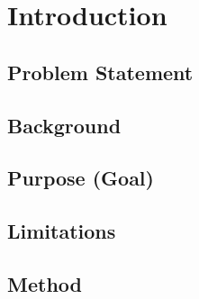 \section{Introduction}

\subsection{Problem Statement}

\subsection{Background}

\subsection{Purpose (Goal)}

\subsection{Limitations}

\subsection{Method}


